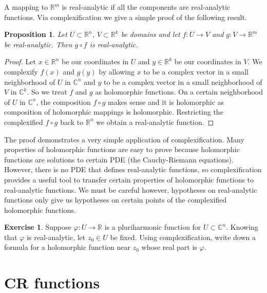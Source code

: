 \documentclass[12pt,openany]{book}
\newcommand{\C}{{\mathbb{C}}}
\newcommand{\R}{{\mathbb{R}}}
\theoremstyle{plain}
\newtheorem{prop}[thm]{Proposition}
\theoremstyle{remark}
\theoremstyle{definition}
\newenvironment{exbox}{%
    \def\FrameCommand{\vrule width 1pt \relax\hspace {10pt}}%
    \MakeFramed {\advance \hsize -\width \FrameRestore }%
}{%
    \endMakeFramed
}
\theoremstyle{exercise}
\newtheorem{exercise}{Exercise}[section]
\theoremstyle{example}
\begin{document}
A mapping to $\R^m$ is real-analytic if all the components are real-analytic
functions.  Via complexification we give a simple proof of the following
result.

\begin{prop}
Let $U \subset \R^n$, $V \subset \R^k$ be domains and let
$f \colon U \to V$ and $g \colon V \to \R^m$ be real-analytic.
Then $g \circ f$ is real-analytic.
\end{prop}

\begin{proof}
Let $x \in \R^n$ be our coordinates in $U$ and $y \in \R^k$ be
our coordinates in $V$.  We complexify $f(x)$ and $g(y)$ by
allowing $x$ to be a complex vector in a small neighborhood of $U$ in
$\C^n$
and  $y$ to be a complex vector in a small neighborhood of $V$ in $\C^k$.
So we treat $f$ and $g$ as holomorphic functions.  On a certain
neighborhood of $U$ in $\C^n$, the composition $f \circ g$ makes sense
and it is holomorphic as composition of holomorphic mappings is holomorphic.
Restricting the complexified $f \circ g$ back to $\R^n$ we obtain a
real-analytic function.
\end{proof}

The proof demonstrates a very simple application of complexification.  Many
properties of holomorphic functions are easy to prove because
holomorphic functions are solutions to certain PDE (the Cauchy-Riemann
equations).  However, there is no PDE
that defines real-analytic functions, so complexification provides a useful
tool to transfer certain properties of holomorphic functions to
real-analytic functions.  We must be careful however, hypotheses on
real-analytic functions only give us hypotheses on certain points of the
complexified holomorphic functions.

\begin{exbox}
\begin{exercise}
Suppose $\varphi \colon U \to \R$ is a pluriharmonic function for $U \subset
\C^n$.  Knowing that $\varphi$ is real-analytic, let $z_0 \in U$ be fixed.
Using complexification, write down a formula for a holomorphic function near
$z_0$ whose real part is $\varphi$.
\end{exercise}
\end{exbox}


\section{CR functions}
\end{document}
